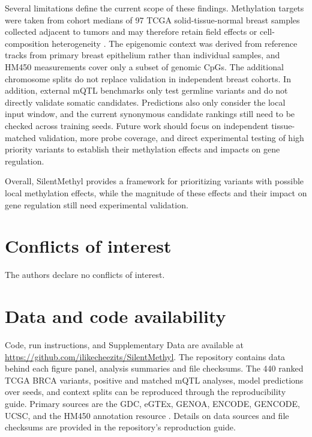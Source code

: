 \documentclass[11pt,letterpaper]{article}
\begin{document}
Several limitations define the current scope of these findings. Methylation targets were taken from cohort medians of 97 TCGA solid-tissue-normal breast samples collected adjacent to tumors and may therefore retain field effects or cell-composition heterogeneity \cite{tcga2012breast,teschendorff2016field}. The epigenomic context was derived from reference tracks from primary breast epithelium rather than individual samples, and HM450 measurements cover only a subset of genomic CpGs. The additional chromosome splits do not replace validation in independent breast cohorts. In addition, external mQTL benchmarks only test germline variants and do not directly validate somatic candidates. Predictions also only consider the local input window, and the current synonymous candidate rankings still need to be checked across training seeds.  Future work should focus on independent tissue-matched validation, more probe coverage, and direct experimental testing of high priority variants to establish their methylation effects and impacts on gene regulation.

Overall, SilentMethyl provides a framework for prioritizing variants with possible local methylation effects, while the magnitude of these effects and their impact on gene regulation still need experimental validation.

\section*{Conflicts of interest}
The authors declare no conflicts of interest. 

\section*{Data and code availability}
Code, run instructions, and Supplementary Data are available at \url{https://github.com/ilikecheezits/SilentMethyl}. The repository contains data behind each figure panel, analysis summaries and file checksums. The 440 ranked TCGA BRCA variants, positive and matched mQTL analyses, model predictions over seeds, and context splits can be reproduced through the reproducibility guide. Primary sources are the GDC, eGTEx, GENOA, ENCODE, GENCODE, UCSC, and the HM450 annotation resource \cite{grossman2016gdc,oliva2023mqtl,shang2023genoa,encode2012integrated,frankish2021gencode,kent2002ucsc,zhou2017infinium}.
Details on data sources and file checksums are provided in the repository's reproduction guide.
\end{document}
